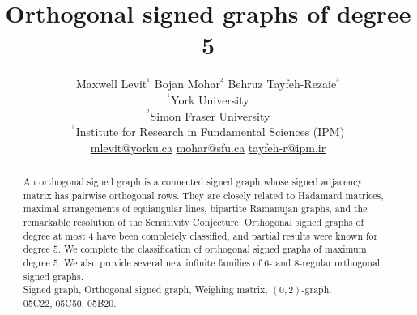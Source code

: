 \documentclass[11pt]{article}
\theoremstyle{plain}
\theoremstyle{definition}
\begin{document}
\title{\bf{\LARGE Orthogonal signed graphs of degree 5}}



\author{
Maxwell Levit$^{^{1}}$  \qquad  Bojan Mohar$^{^{2}}$  \qquad   Behruz Tayfeh-Rezaie$^{^{3}}$\\[2mm]
$^{^1}$York University\\
$^{^2}$Simon Fraser University\\
$^{^3}$Institute for Research in
Fundamental  Sciences (IPM)\\[2mm]
\href{mailto:maxwell\_levit@sfu.ca}{mlevit@yorku.ca} \qquad
\href{mailto:mohar@sfu.ca}{mohar@sfu.ca}  \qquad
\href{mailto:tayfeh-r@ipm.ir}{tayfeh-r@ipm.ir}}





\date{}



\maketitle


\begin{abstract}
\noindent
An orthogonal signed graph is a connected signed graph whose signed adjacency matrix has pairwise orthogonal rows. They are closely related to Hadamard matrices, maximal arrangements of equiangular lines, bipartite Ramanujan graphs, and the remarkable resolution of the Sensitivity Conjecture. 
Orthogonal signed graphs of degree at most 4 have been completely classified, and partial results were known for degree $5$.
We complete the classification of orthogonal signed graphs of maximum degree $5$. We also provide several new infinite families of 6- and 8-regular orthogonal signed graphs.
 \\[3mm]
 Signed graph, Orthogonal signed graph,  Weighing matrix, $(0,2)$-graph.\\
  05C22, 05C50, 05B20.
\end{abstract}
\end{document}
